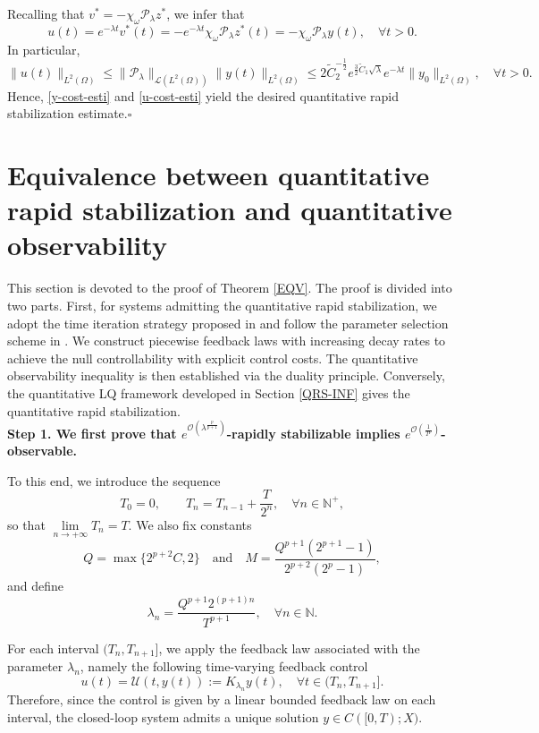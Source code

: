 \documentclass[a4paper]{article}
\numberwithin{equation}{section}
\begin{document}
Recalling that $v^*=-\chi_\omega \mathcal P_\lambda z^*$, we infer that
$$u(t)=e^{-\lambda t}v^*(t)=-e^{-\lambda t}\chi_\omega\mathcal P_\lambda z^*(t)=-\chi_\omega\mathcal P_\lambda y(t),\quad\forall t>0.$$
In particular, 
\begin{equation}\label{u-cost-esti}
\|u(t)\|_{L^2(\Omega)}\le \|\mathcal{P}_\lambda\|_{\mathcal L(L^2(\Omega))}\|y(t)\|_{L^2(\Omega)}\le 2\tilde C_2^{-\frac 12} e^{\frac 32\tilde C_1\sqrt{\lambda}}e^{-\lambda t}\|y_0\|_{L^2(\Omega)},\quad \forall t>0.
\end{equation}
Hence, \eqref{y-cost-esti} and \eqref{u-cost-esti} yield the desired quantitative rapid stabilization estimate.\hfill$\square$ 


\section{Equivalence between quantitative rapid stabilization and quantitative observability}\label{EQUV-SEC}

This section is devoted to the proof of Theorem \ref{EQV}. The proof is divided into two parts. First, for systems admitting the quantitative rapid stabilization, we adopt the time iteration strategy proposed in \cite{CN} and follow the parameter selection scheme in \cite{X2}. We construct piecewise feedback laws with increasing decay rates to achieve the null controllability with explicit control costs. The quantitative observability inequality is then established via the duality principle. Conversely, the quantitative LQ framework developed in Section \ref{QRS-INF} gives the quantitative rapid stabilization.\\[-2mm] 

\noindent\textbf{Step 1. We first prove that $e^{\mathcal O(\lambda^{\frac{p}{p+1}})}$-rapidly stabilizable implies $e^{\mathcal O({\frac{1}{T^p}})}$-observable.}

To this end, we introduce the sequence
$$T_0=0,\qquad T_n=T_{n-1}+\frac{T}{2^n},\quad \forall n\in\mathbb N^+,$$
so that $\lim\limits_{n\to+\infty}T_n=T$. We also fix constants
$$Q=\max\{2^{p+2}C,2\}\quad\text{and}\quad M=\frac{Q^{p+1}(2^{p+1}-1)}{2^{p+2}(2^p-1)},$$ 
and define
$$\lambda_n=\frac{Q^{p+1}2^{(p+1)n}}{T^{p+1}},\quad \forall n\in\mathbb N.$$

For each interval $(T_n,T_{n+1}]$, we apply the feedback law associated with the parameter $\lambda_n$, namely the following time-varying feedback control
\begin{equation}\label{c-1}
u(t)=\mathcal U(t,y(t)):= K_{\lambda_n}y(t),\quad \forall t\in (T_n,T_{n+1}].
\end{equation}
Therefore, since the control is given by a linear bounded feedback law on each interval, the closed-loop system admits a unique solution $y \in C([0,T);X)$.
\end{document}

